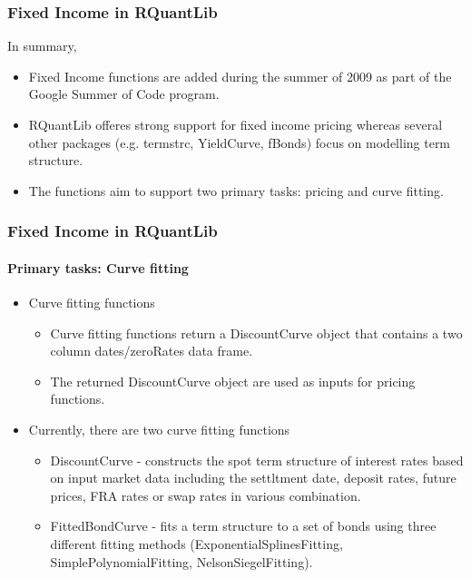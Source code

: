 \documentclass[compress]{beamer}
\begin{document}
\begin{frame}
	\frametitle{Fixed Income in RQuantLib}
	In summary,
	\begin{itemize}
		\item Fixed Income functions are added during the summer of 2009 as part of the Google Summer of Code program. 
		\item  RQuantLib offeres strong support for fixed income pricing whereas several other packages (e.g. termstrc, YieldCurve, fBonds) focus on modelling term structure.		
		\item The functions aim to support two primary tasks: pricing and curve fitting. 		
	\end{itemize}
\end{frame}


\begin{frame}
	\frametitle{Fixed Income in RQuantLib}
	\framesubtitle{Primary tasks: Curve fitting}
	\begin{itemize}
		\item Curve fitting functions
			\begin{itemize}
				\item Curve fitting functions return a DiscountCurve object that contains a two column dates/zeroRates data frame.
				\item The returned DiscountCurve object are used as inputs for pricing functions. 
			\end{itemize}
		\item Currently, there are two curve fitting functions
			\begin{itemize}
				\item DiscountCurve - constructs the spot term structure of interest rates based on input market data including the settltment date, deposit rates, future prices, FRA rates or swap rates in various combination.
				\item FittedBondCurve - fits a term structure to a set of bonds using three different fitting methods (ExponentialSplinesFitting, SimplePolynomialFitting, NelsonSiegelFitting).
			\end{itemize}
	\end{itemize}
\end{frame}
\end{document}
